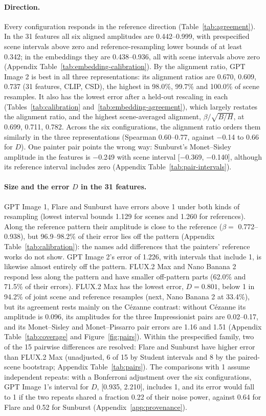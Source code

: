 \documentclass[10pt]{article}
\begin{document}
\paragraph{Direction.} Every configuration responds in the reference direction
(Table~\ref{tab:agreement}). In the 31 features all six aligned amplitudes are 0.442--0.999, with
prespecified scene intervals above zero and reference-resampling lower bounds of at least 0.342; in
the embeddings they are 0.438--0.936, all with scene intervals above zero (Appendix
Table~\ref{tab:embedding-calibration}). By the alignment ratio, GPT Image 2 is best in all
three representations: its alignment ratios are 0.670, 0.609, 0.737 (31 features, CLIP, CSD), the
highest in 98.0\%, 99.7\% and 100.0\% of scene resamples. It also has the lowest error after a
held-out rescaling in each (Tables~\ref{tab:calibration} and~\ref{tab:embedding-agreement}), which
largely restates the alignment ratio, and the highest scene-averaged alignment,
$\beta/\sqrt{B/H}$, at 0.699, 0.711, 0.782. Across the six configurations, the alignment ratio
orders them similarly in the three representations (Spearman 0.60--0.77, against $-$0.14 to 0.66
for $D$). One painter pair points the wrong way: Sunburst's
Monet--Sisley amplitude in the features is $-$0.249 with scene interval [$-$0.369, $-$0.140], although
its reference interval includes zero (Appendix Table~\ref{tab:pair-intervals}).

\paragraph{Size and the error $D$ in the 31 features.} GPT Image 1, Flare and Sunburst have errors
above 1 under both kinds of resampling (lowest interval bounds 1.129 for scenes and 1.260 for
references). Along the reference pattern their amplitude is close to the reference ($\beta=$
0.772--0.938), but 96.9--98.2\% of their error lies off the pattern (Appendix
Table~\ref{tab:calibration}): the names add differences that the painters' reference works do not
show. GPT Image 2's error of 1.226, with intervals that include 1, is likewise almost entirely off
the pattern. FLUX.2 Max and Nano Banana 2 respond less along the pattern and have smaller
off-pattern parts (62.0\% and 71.5\% of their errors). FLUX.2 Max has the lowest error, $D=0.801$,
below 1 in 94.2\% of joint scene and reference resamples (next, Nano Banana 2 at 33.4\%), but its
agreement rests mainly on the C\'ezanne contrast: without C\'ezanne its amplitude is 0.096, its
amplitudes for the three Impressionist pairs are 0.02--0.17, and its Monet--Sisley and
Monet--Pissarro pair errors are 1.16 and 1.51 (Appendix Table~\ref{tab:coverage} and
Figure~\ref{fig:pairs}). Within the prespecified family, two of the 15 pairwise differences are
resolved: Flare and Sunburst have higher error than FLUX.2 Max (unadjusted, 6 of 15 by Student
intervals and 8 by the paired-scene bootstrap; Appendix Table~\ref{tab:pairs}). The comparisons with
1 assume independent repeats: with a Bonferroni adjustment over the six configurations, GPT Image
1's interval for $D$, [0.935, 2.210], includes 1, and its error would fall to 1 if the two repeats
shared a fraction 0.22 of their noise power, against 0.64 for Flare and 0.52 for Sunburst
(Appendix~\ref{app:provenance}).
\end{document}
